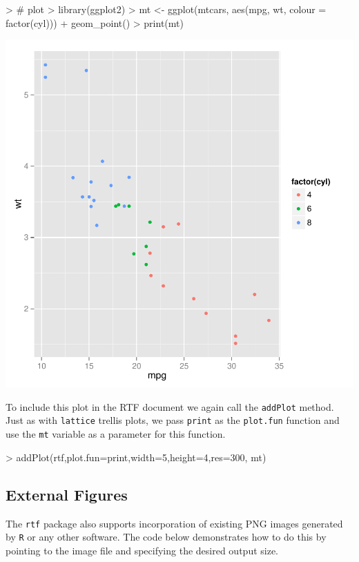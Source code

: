 \documentclass[11pt,letterpaper]{article}
\begin{document}
\begin{center}
\begin{Schunk}
\begin{Sinput}
> # plot
> library(ggplot2)
> mt <- ggplot(mtcars, aes(mpg, wt, colour = factor(cyl))) + geom_point()
> print(mt)
\end{Sinput}
\end{Schunk}
\includegraphics{rtf-029}
\end{center}


To include this plot in the RTF document we again call the \texttt{addPlot} method.  Just as with \texttt{lattice} trellis plots, we pass \texttt{print} as the \texttt{plot.fun} function and use the \texttt{mt} variable as a parameter for this function.


\begin{Schunk}
\begin{Sinput}
> addPlot(rtf,plot.fun=print,width=5,height=4,res=300, mt)
\end{Sinput}
\end{Schunk}


\subsection{External Figures}
The \texttt{rtf} package also supports incorporation of existing PNG images generated by \texttt{R} or any other software.  The code below demonstrates how to do this by pointing to the image file and specifying the desired output size.
\end{document}
